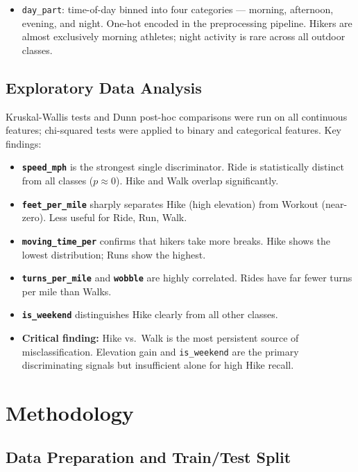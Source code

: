 \documentclass[11pt, onecolumn]{article}
\begin{document}
\begin{itemize}
    \item \texttt{day\_part}: time-of-day binned into four categories --- morning, 
    afternoon, evening, and night. One-hot encoded in the preprocessing pipeline. 
    Hikers are almost exclusively morning athletes; night activity is rare across 
    all outdoor classes.
\end{itemize}

\subsection{Exploratory Data Analysis}

Kruskal-Wallis tests and Dunn post-hoc comparisons were run on all continuous features; chi-squared tests were applied to binary and categorical features. Key findings:

\begin{itemize}
    \item \textbf{\texttt{speed\_mph}} is the strongest single discriminator. Ride is statistically distinct from all classes ($p \approx 0$). Hike and Walk overlap significantly.
    \item \textbf{\texttt{feet\_per\_mile}} sharply separates Hike (high elevation) from Workout (near-zero). Less useful for Ride, Run, Walk.
    \item \textbf{\texttt{moving\_time\_per}} confirms that hikers take more breaks. Hike shows the lowest distribution; Runs show the highest.
    \item \textbf{\texttt{turns\_per\_mile}} and \textbf{\texttt{wobble}} are highly correlated. Rides have far fewer turns per mile than Walks.
    \item \textbf{\texttt{is\_weekend}} distinguishes Hike clearly from all other classes.
    \item \textbf{Critical finding:} Hike vs.\ Walk is the most persistent source of misclassification. Elevation gain and \texttt{is\_weekend} are the primary discriminating signals but insufficient alone for high Hike recall.
\end{itemize}

\section{Methodology}

\subsection{Data Preparation and Train/Test Split}
\end{document}
